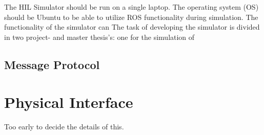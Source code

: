 The HIL Simulator should be run on a single laptop. The operating system (OS) should be Ubuntu to be able to utilize ROS functionality during simulation. The functionality of the simulator can The task of developing the simulator is divided in two project- and master thesis's: one for the simulation of 

\subsection{Message Protocol}


\section{Physical Interface}
Too early to decide the details of this.

